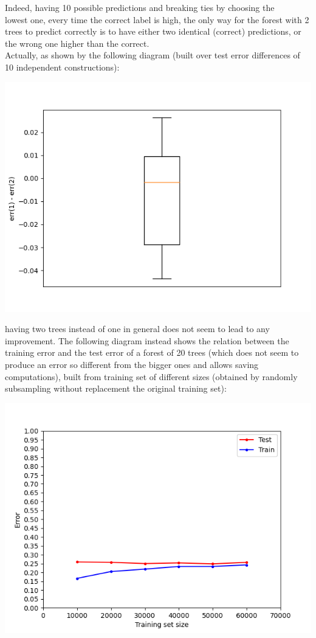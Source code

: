 \documentclass[12pt]{article}
\begin{document}
Indeed, having 10 possible predictions and breaking ties by choosing the\\ lowest one, every time the correct label is high, the only way for the forest with 2 trees to predict correctly is to have either two identical (correct) predictions, or the wrong one higher than the correct.\\
Actually, as shown by the following diagram (built over test error differences of 10 independent constructions):
\begin{center}
\includegraphics[width=1.3\textwidth]{Images/Forest2_diag.png}
\end{center}
having two trees instead of one in general does not seem to lead to any\\ improvement.
\newpage
The following diagram instead shows the relation between the training error and the test error of a forest of 20 trees (which does not seem to produce an error so different from the bigger ones and allows saving computations), built from training set of different sizes (obtained by randomly subsampling without replacement the original training set):
\begin{center}
\includegraphics[width=1.3\textwidth]{Images/Test_vs_train_diag.png}
\end{center}
\end{document}
